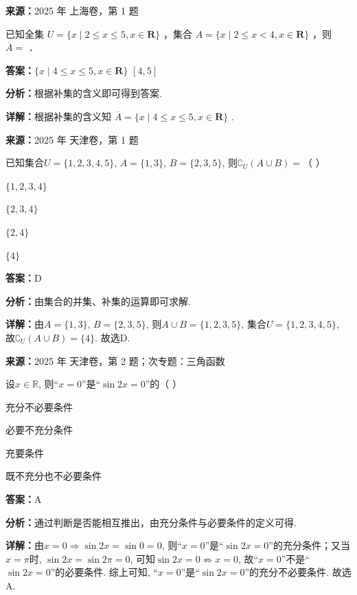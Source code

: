\begin{question}[points=4]
\textbf{来源：}2025 年 上海卷，第 1 题\par
已知全集 $U = \{x \mid 2 \leq x \leq 5, x \in \mathbf{R}\}$ ，集合 $A = \{x \mid 2 \leq x < 4, x \in \mathbf{R}\}$ ，则 $\overline{A} =$ ．
\begin{solution}
\textbf{答案：}$\{x \mid 4 \leq x \leq 5, x \in \mathbf{R}\}$  $[4,5]$

\textbf{分析：}根据补集的含义即可得到答案.

\textbf{详解：}根据补集的含义知 $\overline{A} = \{x \mid 4 \leq x \leq 5, x \in \mathbf{R}\}$ .
\end{solution}
\end{question}

\begin{question}[points=5]
\textbf{来源：}2025 年 天津卷，第 1 题\par
已知集合$U = \{1,2,3,4,5\}$, $A = \{1,3\}$, $B = \{2,3,5\}$, 则$\complement_U (A \cup B) = $（   ）
\begin{choices}
  \item $\{1,2,3,4\}$
  \item $\{2,3,4\}$
  \item $\{2,4\}$
  \item $\{4\}$
\end{choices}
\begin{solution}
\textbf{答案：}D

\textbf{分析：}由集合的并集、补集的运算即可求解.

\textbf{详解：}由$A = \{1,3\}$, $B = \{2,3,5\}$, 则$A \cup B = \{1,2,3,5\}$, 集合$U = \{1,2,3,4,5\}$, 故$\complement_U (A \cup B) = \{4\}$. 故选D.
\end{solution}
\end{question}

\begin{question}[points=5]
\textbf{来源：}2025 年 天津卷，第 2 题；次专题：三角函数\par
设$x \in \mathbb{R}$, 则“$x = 0$”是“$\sin 2x = 0$”的（   ）
\begin{choices}
  \item 充分不必要条件
  \item 必要不充分条件
  \item 充要条件
  \item 既不充分也不必要条件
\end{choices}
\begin{solution}
\textbf{答案：}A

\textbf{分析：}通过判断是否能相互推出，由充分条件与必要条件的定义可得.

\textbf{详解：}由$x = 0 \Rightarrow \sin 2x = \sin 0 = 0$, 则“$x = 0$”是“$\sin 2x = 0$”的充分条件；又当$x = \pi$时, $\sin 2x = \sin 2\pi = 0$, 可知$\sin 2x = 0 \not\Rightarrow x = 0$, 故“$x = 0$”不是“$\sin 2x = 0$”的必要条件. 综上可知, “$x = 0$”是“$\sin 2x = 0$”的充分不必要条件. 故选A.
\end{solution}
\end{question}

